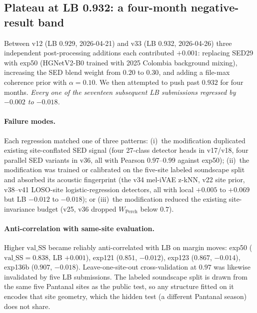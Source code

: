 \subsection{Plateau at LB 0.932: a four-month negative-result band}
\label{sec:plateau}

Between v12 (LB 0.929, 2026-04-21) and v33 (LB 0.932, 2026-04-26)
three independent post-processing additions each contributed
$+0.001$: replacing SED29 with exp50 (HGNetV2-B0 trained with
2025 Colombia background mixing), increasing the SED blend weight
from $0.20$ to $0.30$, and adding a file-max coherence prior with
$\alpha = 0.10$. We then attempted to push past $0.932$ for four
months. \emph{Every one of the seventeen subsequent LB submissions
regressed by $-0.002$ to $-0.018$.}

\paragraph{Failure modes.}
Each regression matched one of three patterns: (i)~the
modification duplicated existing site-conflated SED signal
(four 27-class detector heads in v17/v18, four parallel SED
variants in v36, all with Pearson $0.97$--$0.99$ against
exp50); (ii)~the modification was trained or calibrated on
the five-site labeled soundscape split and absorbed its acoustic
fingerprint (the v34 mel-iVAE z-kNN, v22 site prior, v38--v41
LOSO-site logistic-regression detectors, all with local
$+0.005$ to $+0.069$ but LB $-0.012$ to $-0.018$); or (iii)~the
modification reduced the existing site-invariance budget
(v25, v36 dropped $W_{\text{Perch}}$ below $0.7$).

\paragraph{Anti-correlation with same-site evaluation.}
Higher $\text{val\_SS}$ became reliably anti-correlated with LB
on margin moves: exp50 ($\text{val\_SS}=0.838$, LB $+0.001$),
exp121 ($0.851$, $-0.012$), exp123 ($0.867$, $-0.014$),
exp136b ($0.907$, $-0.018$). Leave-one-site-out cross-validation
at $0.97$ was likewise invalidated by five LB submissions. The
labeled soundscape split is drawn from the same five Pantanal
sites as the public test, so any structure fitted on it encodes
that site geometry, which the hidden test (a different Pantanal
season) does not share.

